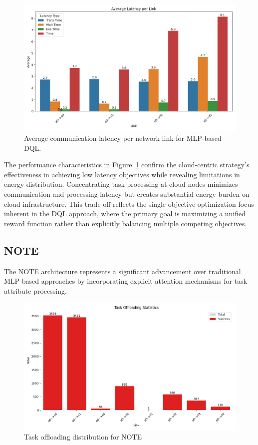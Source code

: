 \documentclass[preprint,3p,authoryear]{elsarticle}
\begin{document}
\begin{figure}[H]
    \centering
    \includegraphics[width=0.5\linewidth]{figs/MLP/avg_latency_per_link.png}
    \caption{Average communication latency per network link for MLP-based DQL.}
    \label{fig:mlp-avg-latency}
\end{figure}

The performance characteristics in Figure~\ref{fig:mlp-avg-latency} confirm the cloud-centric strategy's effectiveness in achieving low latency objectives while revealing limitations in energy distribution. Concentrating task processing at cloud nodes minimizes communication and processing latency but creates substantial energy burden on cloud infrastructure. This trade-off reflects the single-objective optimization focus inherent in the DQL approach, where the primary goal is maximizing a unified reward function rather than explicitly balancing multiple competing objectives.

\subsection{NOTE}

The NOTE architecture represents a significant advancement over traditional MLP-based approaches by incorporating explicit attention mechanisms for task attribute processing. 

\begin{figure}[H]
    \centering
    \includegraphics[width=0.5\linewidth]{figs/NOTE/task_offloading_statistics.png}
    \caption{Task offloading distribution for NOTE}
    \label{fig:NOTE-offloading-stats}
\end{figure}
\end{document}

